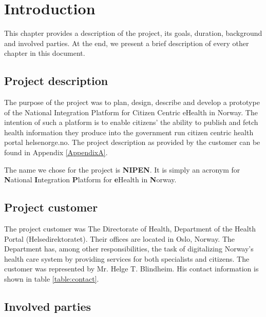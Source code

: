 
\chapter{Introduction} 
\label{Introduction} 


This chapter provides a description of the project, its goals, duration, background and involved parties.
At the end, we present a brief description of every other chapter in this document.

\section{Project description}
\label{section:description}

The purpose of the project was to plan, design, describe and develop a prototype of the National Integration Platform for Citizen Centric eHealth in Norway\cite{ehealth}. 
The intention of such a platform is to enable citizens’ the ability to publish and fetch health information they produce into the government run citizen centric health portal helsenorge.no.
The project description as provided by the customer can be found in Appendix \ref{AppendixA}.

The name we chose for the project is \textbf{NIPEN}.\newline
It is simply an acronym for \textbf{N}ational \textbf{I}ntegration \textbf{P}latform for \textbf{e}Health
in \textbf{N}orway.

\section{Project customer}
\label{section:customer}

The project customer was The Directorate of Health, Department of the Health Portal (Helsedirektoratet).
Their offices are located in Oslo, Norway. 
The Department has, among other responsibilities, the task of digitalizing Norway's health care system by providing services for both specialists and citizens. The customer was represented by Mr. Helge T. Blindheim.
His contact information is shown in table \ref{table:contact}.

\section{Involved parties}
\label{section:parties}

